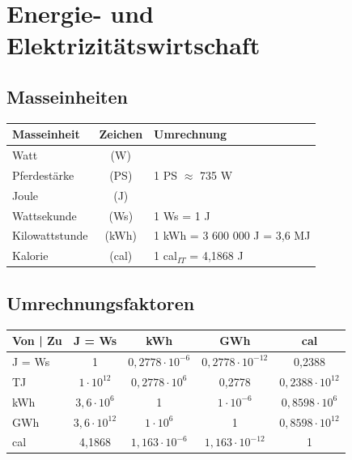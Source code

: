\section{Energie- und Elektrizitätswirtschaft}

\subsection{Masseinheiten}

\begin{tabular}{|l|c|l|}
    \hline
    \textbf{Masseinheit}    & \textbf{Zeichen}  & \textbf{Umrechnung} \\
    \hline
    Watt                    & (W)               & \\ 
    Pferdestärke            & (PS)              & 1 PS $\approx$ 735 W \\ 
    \hline
    Joule                   & (J)               & \\ 
    Wattsekunde             & (Ws)              & 1 Ws = 1 J \\ 
    Kilowattstunde          & (kWh)             & 1 kWh = 3 600 000 J = 3,6 MJ \\ 
    Kalorie                 & (cal)             & 1 cal$_{IT}$ = 4,1868 J \\ 
    \hline
\end{tabular}


\subsection{Umrechnungsfaktoren}

\begin{tabular}{|l|c|c|c|c|}
    \hline
    \textbf{\textbf{Von | Zu}}  & \textbf{J = Ws}           & \textbf{kWh}                  & \textbf{GWh}              & \textbf{cal} \\
    \hline
            J = Ws              & 1                         & $0,2778 \cdot 10^{-6}$        & $0,2778 \cdot 10^{-12}$   & 0,2388 \\
            TJ                  & $1 \cdot 10^{12}$         & $0,2778 \cdot 10^{6}$         & 0,2778                    & $0,2388 \cdot 10^{12}$ \\
            kWh                 & $3,6 \cdot 10^{6}$        & 1                             & $1 \cdot 10^{-6}$         & $0,8598 \cdot 10^{6}$ \\
            GWh                 & $3,6 \cdot 10^{12}$       & $1 \cdot 10^{6}$              & 1                         & $0,8598 \cdot 10^{12}$ \\
            cal                 & 4,1868                    & $1,163 \cdot 10^{-6}$         & $1,163 \cdot 10^{-12}$    & 1 \\
    \hline
\end{tabular}


